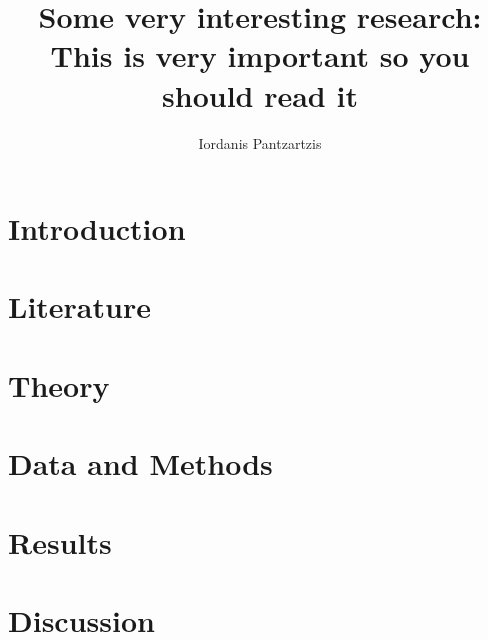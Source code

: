 \documentclass[11pt, xcolor=dvipsnames]{article}
\author[1]{Iordanis Pantzartzis}
\affil[1]{Universität Konstanz, 01/1001158}
\title{Some very interesting research: This is very important so you should read it}
\begin{document}


\restoregeometry

\maketitle

\section*{Introduction}

\nocite{*}
\section*{Literature}


\section*{Theory}


\section*{Data and Methods}


\section*{Results}


\section*{Discussion}


\newpage
\newpage
\thispagestyle{empty}
\begingroup
{}
\printbibliography
\endgroup
\end{document}

